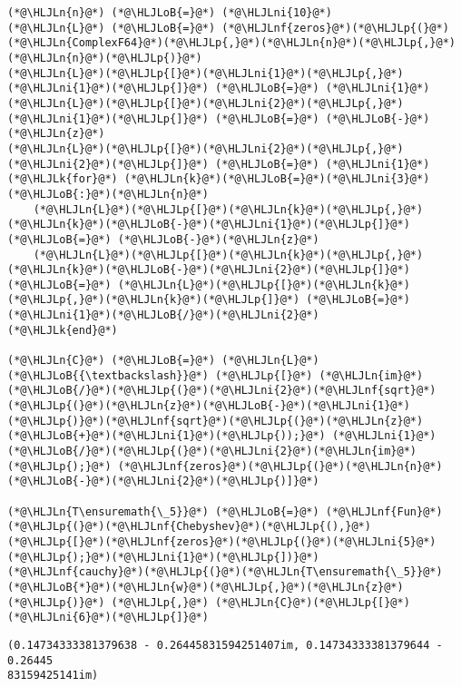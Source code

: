 \documentclass[12pt,landscape]{article}
\newcommand{\HLJLk}[1]{\textcolor[RGB]{148,91,176}{\textbf{#1}}}
\newcommand{\HLJLn}[1]{#1}
\newcommand{\HLJLnf}[1]{\textcolor[RGB]{66,102,213}{#1}}
\newcommand{\HLJLni}[1]{\textcolor[RGB]{59,151,46}{#1}}
\newcommand{\HLJLoB}[1]{\textcolor[RGB]{102,102,102}{\textbf{#1}}}
\newcommand{\HLJLp}[1]{#1}
\begin{document}
{\begin{lstlisting}
(*@\HLJLn{n}@*) (*@\HLJLoB{=}@*) (*@\HLJLni{10}@*)
(*@\HLJLn{L}@*) (*@\HLJLoB{=}@*) (*@\HLJLnf{zeros}@*)(*@\HLJLp{(}@*)(*@\HLJLn{ComplexF64}@*)(*@\HLJLp{,}@*)(*@\HLJLn{n}@*)(*@\HLJLp{,}@*)(*@\HLJLn{n}@*)(*@\HLJLp{)}@*)
(*@\HLJLn{L}@*)(*@\HLJLp{[}@*)(*@\HLJLni{1}@*)(*@\HLJLp{,}@*)(*@\HLJLni{1}@*)(*@\HLJLp{]}@*) (*@\HLJLoB{=}@*) (*@\HLJLni{1}@*)
(*@\HLJLn{L}@*)(*@\HLJLp{[}@*)(*@\HLJLni{2}@*)(*@\HLJLp{,}@*)(*@\HLJLni{1}@*)(*@\HLJLp{]}@*) (*@\HLJLoB{=}@*) (*@\HLJLoB{-}@*)(*@\HLJLn{z}@*)
(*@\HLJLn{L}@*)(*@\HLJLp{[}@*)(*@\HLJLni{2}@*)(*@\HLJLp{,}@*)(*@\HLJLni{2}@*)(*@\HLJLp{]}@*) (*@\HLJLoB{=}@*) (*@\HLJLni{1}@*)
(*@\HLJLk{for}@*) (*@\HLJLn{k}@*)(*@\HLJLoB{=}@*)(*@\HLJLni{3}@*)(*@\HLJLoB{:}@*)(*@\HLJLn{n}@*)
    (*@\HLJLn{L}@*)(*@\HLJLp{[}@*)(*@\HLJLn{k}@*)(*@\HLJLp{,}@*)(*@\HLJLn{k}@*)(*@\HLJLoB{-}@*)(*@\HLJLni{1}@*)(*@\HLJLp{]}@*) (*@\HLJLoB{=}@*) (*@\HLJLoB{-}@*)(*@\HLJLn{z}@*)
    (*@\HLJLn{L}@*)(*@\HLJLp{[}@*)(*@\HLJLn{k}@*)(*@\HLJLp{,}@*)(*@\HLJLn{k}@*)(*@\HLJLoB{-}@*)(*@\HLJLni{2}@*)(*@\HLJLp{]}@*) (*@\HLJLoB{=}@*) (*@\HLJLn{L}@*)(*@\HLJLp{[}@*)(*@\HLJLn{k}@*)(*@\HLJLp{,}@*)(*@\HLJLn{k}@*)(*@\HLJLp{]}@*) (*@\HLJLoB{=}@*) (*@\HLJLni{1}@*)(*@\HLJLoB{/}@*)(*@\HLJLni{2}@*)
(*@\HLJLk{end}@*)

(*@\HLJLn{C}@*) (*@\HLJLoB{=}@*) (*@\HLJLn{L}@*) (*@\HLJLoB{{\textbackslash}}@*) (*@\HLJLp{[}@*) (*@\HLJLn{im}@*)(*@\HLJLoB{/}@*)(*@\HLJLp{(}@*)(*@\HLJLni{2}@*)(*@\HLJLnf{sqrt}@*)(*@\HLJLp{(}@*)(*@\HLJLn{z}@*)(*@\HLJLoB{-}@*)(*@\HLJLni{1}@*)(*@\HLJLp{)}@*)(*@\HLJLnf{sqrt}@*)(*@\HLJLp{(}@*)(*@\HLJLn{z}@*)(*@\HLJLoB{+}@*)(*@\HLJLni{1}@*)(*@\HLJLp{));}@*) (*@\HLJLni{1}@*)(*@\HLJLoB{/}@*)(*@\HLJLp{(}@*)(*@\HLJLni{2}@*)(*@\HLJLn{im}@*)(*@\HLJLp{);}@*) (*@\HLJLnf{zeros}@*)(*@\HLJLp{(}@*)(*@\HLJLn{n}@*)(*@\HLJLoB{-}@*)(*@\HLJLni{2}@*)(*@\HLJLp{)]}@*)

(*@\HLJLn{T\ensuremath{\_5}}@*) (*@\HLJLoB{=}@*) (*@\HLJLnf{Fun}@*)(*@\HLJLp{(}@*)(*@\HLJLnf{Chebyshev}@*)(*@\HLJLp{(),}@*) (*@\HLJLp{[}@*)(*@\HLJLnf{zeros}@*)(*@\HLJLp{(}@*)(*@\HLJLni{5}@*)(*@\HLJLp{);}@*)(*@\HLJLni{1}@*)(*@\HLJLp{])}@*)
(*@\HLJLnf{cauchy}@*)(*@\HLJLp{(}@*)(*@\HLJLn{T\ensuremath{\_5}}@*)(*@\HLJLoB{*}@*)(*@\HLJLn{w}@*)(*@\HLJLp{,}@*)(*@\HLJLn{z}@*)(*@\HLJLp{)}@*) (*@\HLJLp{,}@*) (*@\HLJLn{C}@*)(*@\HLJLp{[}@*)(*@\HLJLni{6}@*)(*@\HLJLp{]}@*)
\end{lstlisting}

\begin{lstlisting}
(0.14734333381379638 - 0.26445831594251407im, 0.14734333381379644 - 0.26445
83159425141im)
\end{lstlisting}


}
\end{document}
